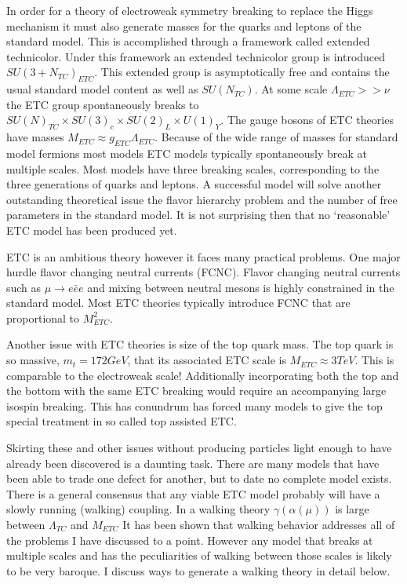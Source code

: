 In order for a theory of electroweak symmetry breaking to replace the Higgs mechanism it must also generate masses for the quarks and leptons of the standard model.
This is accomplished through a framework called extended technicolor.
Under this framework an extended technicolor group is introduced $SU(3+N_{TC})_{ETC}$.
This extended group is asymptotically free and contains the usual standard model content as well as $SU(N_{TC})$.
At some scale $\Lambda_{ETC}>>\nu$ the ETC group spontaneously breaks to $SU(N)_{TC}\times SU(3)_c\times SU(2)_L\times U(1)_Y$.
The gauge bosons of ETC theories have masses $M_{ETC} \approx g_{ETC}\Lambda_{ETC}$.
Because of the wide range of masses for standard model fermions most models ETC models typically spontaneously break at multiple scales.
Most models have three breaking scales, corresponding to the three generations of quarks and leptons.
A successful model will solve another outstanding theoretical issue the flavor hierarchy problem and the number of free parameters in the standard model.
It is not surprising then that no `reasonable' ETC model has been produced yet.

ETC is an ambitious theory however it faces many practical problems.
One major hurdle flavor changing neutral currents (FCNC).
Flavor changing neutral currents such as $\mu\rightarrow e\bar{e}e$ and mixing between neutral mesons is highly constrained in the standard model.
Most ETC theories typically introduce FCNC that are proportional to $M^2_{ETC}$.

Another issue with ETC theories is size of the top quark mass.
The top quark is so massive, $m_t=172 GeV$, that its associated ETC scale is $M_{ETC}\approx 3 TeV$.
This is comparable to the electroweak scale!
Additionally incorporating both the top and the bottom with the same ETC breaking would require an accompanying large isospin breaking.
This has conundrum has forced many models to give the top special treatment in so called top assisted ETC.

Skirting these and other issues without producing particles light enough to have already been discovered is a daunting task.
There are many models that have been able to trade one defect for another, but to date no complete model exists.
There is a general consensus that any viable ETC model probably will have a slowly running (walking) coupling.
In a walking theory $\gamma(\alpha(\mu))$ is large between $\Lambda_{TC}$ and $M_{ETC}$ 
It has been shown that walking behavior addresses all of the problems I have discussed to a point.
However any model that breaks at multiple scales and has the peculiarities of walking between those scales is likely to be very baroque.
I discuss ways to generate a walking theory in detail below.

